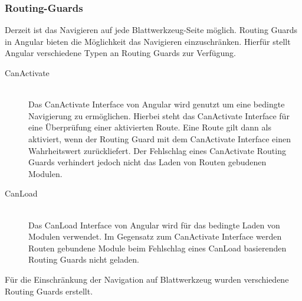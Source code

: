 \subsubsection{Routing-Guards}
\label{sec:routing-guards}
Derzeit ist das Navigieren auf jede Blattwerkzeug-Seite möglich. Routing Guards in Angular bieten die Möglichkeit das Navigieren einzuschränken. Hierfür stellt Angular verschiedene Typen an Routing Guards zur Verfügung.

\begin{description}
	\item[CanActivate]\hfill\\
	Das CanActivate Interface von Angular wird genutzt um eine bedingte Navigierung zu ermöglichen. Hierbei steht das CanActivate Interface für eine Überprüfung einer aktivierten Route. Eine Route gilt dann als aktiviert, wenn der Routing Guard mit dem CanActivate Interface einen Wahrheitswert zurückliefert. Der Fehlschlag eines CanActivate Routing Guards verhindert jedoch nicht das Laden von Routen gebudenen Modulen.
	\item[CanLoad]\hfill\\
	Das CanLoad Interface von Angular wird für das bedingte Laden von Modulen verwendet. Im Gegensatz zum CanActivate Interface werden Routen gebundene Module beim Fehlschlag eines CanLoad basierenden Routing Guards nicht geladen.
\end{description}

Für die Einschränkung der Navigation auf Blattwerkzeug wurden verschiedene Routing Guards erstellt.


